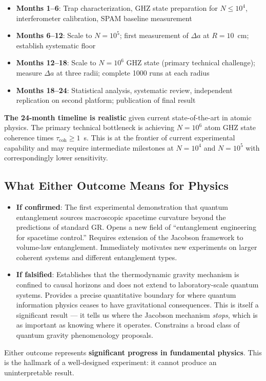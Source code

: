 \begin{itemize}
    \item \textbf{Months 1--6}: Trap characterization, GHZ state
    preparation for $N \leq 10^4$, interferometer calibration, SPAM
    baseline measurement

    \item \textbf{Months 6--12}: Scale to $N = 10^5$; first measurement
    of $\Delta a$ at $R = 10$~cm; establish systematic floor

    \item \textbf{Months 12--18}: Scale to $N = 10^6$ GHZ state (primary
    technical challenge); measure $\Delta a$ at three radii; complete
    1000 runs at each radius

    \item \textbf{Months 18--24}: Statistical analysis, systematic review,
    independent replication on second platform; publication of final result
\end{itemize}

\noindent\textbf{The 24-month timeline is realistic} given current
state-of-the-art in atomic physics. The primary technical bottleneck is
achieving $N = 10^6$ atom GHZ state coherence times $\tau_{\mathrm{coh}}
\geq 1$~s. This is at the frontier of current experimental capability
and may require intermediate milestones at $N = 10^4$ and $N = 10^5$
with correspondingly lower sensitivity.

\subsection{What Either Outcome Means for Physics}
\label{subsec:significance}

\begin{itemize}
    \item \textbf{If confirmed}: The first experimental demonstration that
    quantum entanglement sources macroscopic spacetime curvature beyond
    the predictions of standard GR. Opens a new field of ``entanglement
    engineering for spacetime control.'' Requires extension of the
    Jacobson framework to volume-law entanglement. Immediately motivates
    new experiments on larger coherent systems and different entanglement
    types.

    \item \textbf{If falsified}: Establishes that the thermodynamic
    gravity mechanism is confined to causal horizons and does not extend
    to laboratory-scale quantum systems. Provides a precise quantitative
    boundary for where quantum information physics ceases to have
    gravitational consequences. This is itself a significant result ---
    it tells us where the Jacobson mechanism \emph{stops}, which is as
    important as knowing where it operates. Constrains a broad class of
    quantum gravity phenomenology proposals.
\end{itemize}

Either outcome represents \textbf{significant progress in fundamental
physics}. This is the hallmark of a well-designed experiment: it cannot
produce an uninterpretable result.
